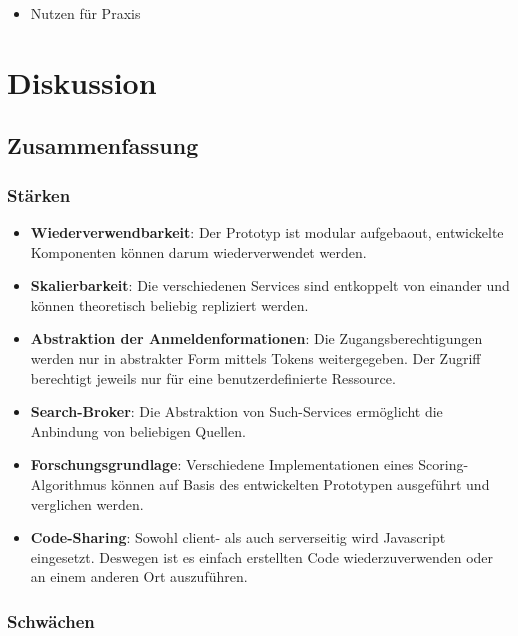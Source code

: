 \begin{itemize}
    \item Nutzen für Praxis
    
\end{itemize}

\section{Diskussion}

\subsection{Zusammenfassung}

\subsubsection{Stärken}

\begin{itemize}
    \item \textbf{Wiederverwendbarkeit}: Der Prototyp ist modular aufgebaout, entwickelte Komponenten können darum wiederverwendet werden.
    \item \textbf{Skalierbarkeit}: Die verschiedenen Services sind entkoppelt von einander und können theoretisch beliebig repliziert werden.
    \item \textbf{Abstraktion der Anmeldenformationen}: Die Zugangsberechtigungen werden nur in abstrakter Form mittels Tokens weitergegeben. Der Zugriff berechtigt jeweils nur für eine benutzerdefinierte Ressource.
    \item \textbf{Search-Broker}: Die Abstraktion von Such-Services ermöglicht die Anbindung von beliebigen Quellen.
    \item \textbf{Forschungsgrundlage}: Verschiedene Implementationen eines Sco\-ring-Algorithmus können auf Basis des entwickelten Prototypen ausgeführt und verglichen werden.
    \item \textbf{Code-Sharing}: Sowohl client- als auch serverseitig wird Javascript eingesetzt. Deswegen ist es einfach erstellten Code wiederzuverwenden oder an einem anderen Ort auszuführen.
\end{itemize}

\subsubsection{Schwächen}

